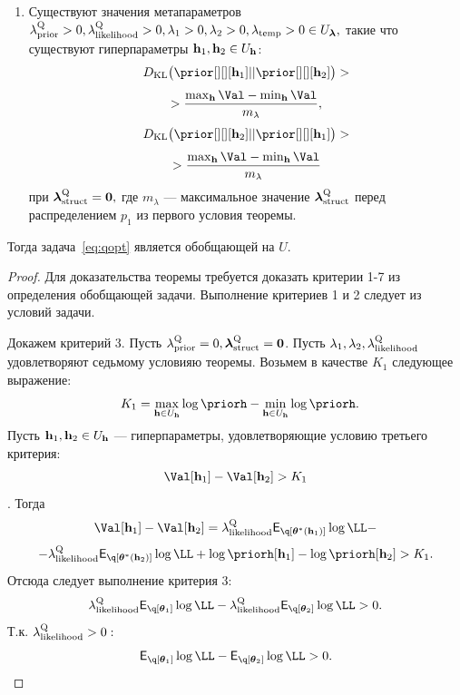 \begin{theorem}
\begin{enumerate}
\item Существуют значения метапараметров $\lambda_\text{prior}^\text{Q}>0,\lambda_\text{likelihood}^\text{Q}>0, \lambda_1>0, \lambda_2>0, \lambda_{\text{temp}}>0  \in U_{\boldsymbol{\lambda}},$ такие что существуют гиперпараметры $\mathbf{h}_1, \mathbf{h}_2 \in U_{\mathbf{h}}$:
\[
\KL{\prior[][][\h_1]}{\prior[][][\h_2]} > 
\]
\[
>\frac{\max_{\h} \Val - \min_{\h} \Val }{m_{\lambda}},
\]
\[
\KL{\prior[][][\h_2]}{\prior[][][\h_1]} >
\]
\[
> \frac{\max_{\h} \Val - \min_{\h} \Val }{m_{\lambda}}
\]
при $\boldsymbol{\lambda}_\text{struct}^\text{Q} = \mathbf{0},$ где $m_{\lambda}$ --- максимальное значение $\boldsymbol{\lambda}_\text{struct}^\text{Q}$ перед распределением $p_1$ из первого условия теоремы.

\end{enumerate}
Тогда задача~\eqref{eq:qopt} является обобщающей на $U$.
\end{theorem}

\begin{proof}
Для доказательства теоремы требуется доказать критерии 1-7 из определения обобщающей задачи.
Выполнение критериев 1 и 2 следует из условий задачи.

Докажем критерий 3. 
Пусть $\lambda_\text{prior}^\text{Q} = 0, \boldsymbol{\lambda}_\text{struct}^\text{Q} = \mathbf{0}$. 
Пусть $\lambda_1, \lambda_2, \lambda_\text{likelihood}^\text{Q}$ удовлетворяют седьмому условияю теоремы.
Возьмем в качестве $K_1$ следующее выражение:
\[
    K_1= \max_{\h \in \Uh} \log \priorh-\min_{\h \in \Uh} \log \priorh.
\]
Пусть $\mathbf{h}_1, \mathbf{h}_2 \in U_{\mathbf{h}}$ --- гиперпараметры, удовлетворяющие условию третьего критерия:
$$ \Val[\h_1] - \Val[\h_2]>K_1$$.
Тогда 
\[
\Val[\h_1] - \Val[\h_2] = \lamLL \E_{\q[\teta^{*}(\h_1)]} \log \LL - 
\]
\[
- \lamLL \E_{\q[\teta^{*}(\h_2)]} \log \LL + \log\priorh[\h_1] - \log\priorh[\h_2]>K_1.
\]
Отсюда следует  выполнение критерия 3:
\[
\lamLL \E_{\q[\teta_1]} \log \LL - \lamLL  \E_{\q[\teta_2]} \log \LL   >0.
\]
Т.к. $\lambda_\text{likelihood}^\text{Q} > 0:$
\[
\E_{\q[\teta_1]} \log \LL -  \E_{\q[\teta_2]} \log \LL   >0.
\]



\end{proof}
